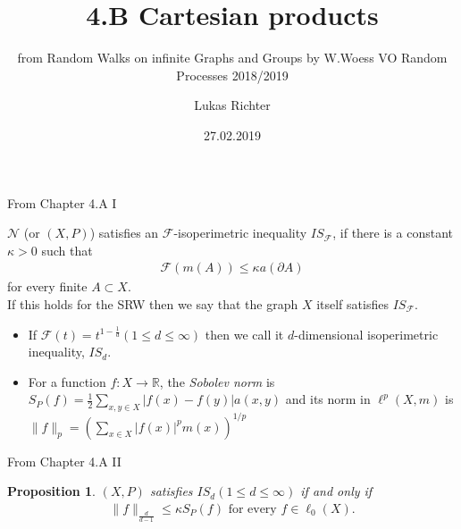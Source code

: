 \documentclass{beamer}\usepackage[]{graphicx}\usepackage[]{color}
\let\otp\titlepage
\renewcommand{\titlepage}{\otp\addtocounter{framenumber}{-1}}
\newtheorem{proposition}{Proposition}
\begin{document}
\title{4.B Cartesian products}
\subtitle{from Random Walks on infinite Graphs and Groups by W.Woess \newline
\newline
VO Random Processes 2018/2019}
\author{Lukas Richter}
\date[]{27.02.2019} %

\begin{frame}[plain]
 \titlepage
\end{frame}

\begin{frame}[fragile]{From Chapter 4.A I}
\begin{definition}
$\mathcal{N}$ (or $(X, P)$) satisfies an $\mathcal{F}$-isoperimetric inequality $IS_{\mathcal{F}}$, if there is a constant $\kappa > 0$ such that
\begin{align*}
 \mathcal{F}(m(A)) \le \kappa a(\partial A)
\end{align*}
for every finite $A \subset X$. \\
If this holds for the SRW then we say that the graph $X$ itself satisfies $IS_{\mathcal{F}}$.
\end{definition}

\begin{itemize}
\item If $\mathcal{F}(t) = t^{1-\frac{1}{d}} (1 \le d \le \infty)$ then we call it $d$-dimensional isoperimetric inequality, $IS_d$.
\item For a function $f:X\to \mathbb{R}$, the \textit{Sobolev norm} is $S_P(f)=\frac{1}{2}\sum_{x,y\in X} | f(x)-f(y) | a(x,y)$ and its norm in $\ell^p(X,m)$ is $\|f\|_p=\left( \sum_{x\in X}|f(x)|^p m(x) \right)^{1/p}$
\end{itemize}
\end{frame}

\begin{frame}[fragile]{From Chapter 4.A II}
\begin{proposition}
$(X,P)$ satisfies $IS_d (1 \le d \le \infty)$ if and only if
\begin{align*}
\|f\|_{\frac{d}{d-1}}\le \kappa S_P(f) \text{ for every } f \in \ell_0(X).
\end{align*}
\end{proposition}
\end{frame}
\end{document}
